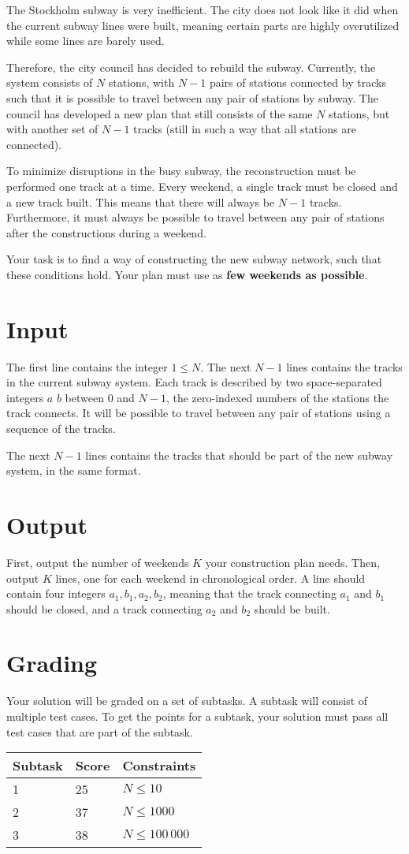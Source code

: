 \def\version{1}
The Stockholm subway is very inefficient.
The city does not look like it did when the current subway lines were built, meaning certain parts are highly overutilized while some lines are barely used.

Therefore, the city council has decided to rebuild the subway.
Currently, the system consists of $N$ stations, with $N - 1$ pairs of stations connected by tracks such that it is possible to travel between any pair of stations by subway.
The council has developed a new plan that still consists of the same $N$ stations, but with another set of $N - 1$ tracks (still in such a way that all stations are connected).

To minimize disruptions in the busy subway, the reconstruction must be performed one track at a time.
Every weekend, a single track must be closed and a new track built.
This means that there will always be $N - 1$ tracks.
Furthermore, it must always be possible to travel between any pair of stations after the constructions during a weekend.

Your task is to find a way of constructing the new subway network, such that these conditions hold.
Your plan must use as \textbf{few weekends as possible}.

\section*{Input}
The first line contains the integer $1 \le N$.
The next $N - 1$ lines contains the tracks in the current subway system.
Each track is described by two space-separated integers $a$ $b$ between $0$ and $N - 1$, the zero-indexed numbers of the stations the track connects.
It will be possible to travel between any pair of stations using a sequence of the tracks.

The next $N - 1$ lines contains the tracks that should be part of the new subway system, in the same format.

\section*{Output}
First, output the number of weekends $K$ your construction plan needs.
Then, output $K$ lines, one for each weekend in chronological order.
A line should contain four integers $a_1, b_1, a_2, b_2$, meaning that the track connecting $a_1$ and $b_1$ should be closed, and a track connecting $a_2$ and $b_2$ should be built.

\section*{Grading}
Your solution will be graded on a set of subtasks.
A subtask will consist of multiple test cases.
To get the points for a subtask, your solution must pass all test cases that are part of the subtask.

\noindent
\begin{tabular}{| l | l | l |}
\hline
Subtask & Score & Constraints \\ \hline
1       & 25    & $N \le 10$ \\ \hline
2       & 37    & $N \le 1000$ \\ \hline
3       & 38    & $N \le 100\,000$ \\ \hline
\end{tabular}
